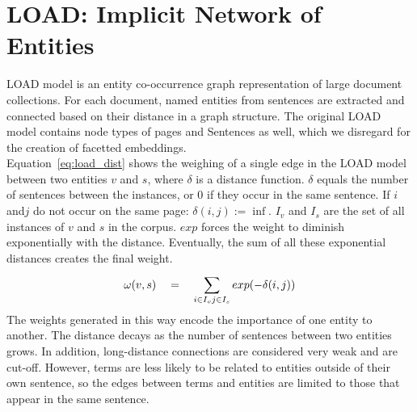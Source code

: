 \section{LOAD: Implicit Network of Entities}
LOAD model is an entity co-occurrence graph representation of large document collections. For each document, named entities from sentences are extracted and connected based on their distance in a graph structure. The original LOAD model contains node types of pages and Sentences as well, which we disregard for the creation of facetted embeddings. \\
Equation~\ref{eq:load_dist} shows the weighing of a single edge in the LOAD model between two entities $v$ and $s$, where $\delta $ is a distance function. $\delta $ equals the number of sentences between the
instances, or $0$ if they occur in the same sentence. If $i$ and$ j$
do not occur on the same page: $ \delta(i, j) := \inf$. $ I_{ v }$ and $I_{ s } $ are the set of all instances of $v$ and $s$ in the corpus. $exp$ forces the weight to diminish exponentially with the distance. Eventually, the sum of all these exponential distances creates the final weight. 
\begin{equation}
\omega (v,s)\quad =\quad \sum _{ i\in I_{ v } \\ j\in I_{ s } }^{  }{ exp } (-\delta (i,j))
\label{eq:load_dist}
\end{equation}
The weights generated in this way encode the importance of one entity to another. The distance decays as the number of sentences between two entities grows.  In addition, long-distance connections are considered very weak and are cut-off.  However, terms are less likely to be related to entities outside of their own sentence, so the edges between terms and entities are limited to those that appear in the same sentence.


